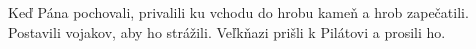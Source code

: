 Keď Pána pochovali, privalili ku vchodu do hrobu kameň a hrob zapečatili.
\versseparator
Postavili vojakov, aby ho strážili.
\versseparator
Veľkňazi prišli k Pilátovi a prosili ho.
